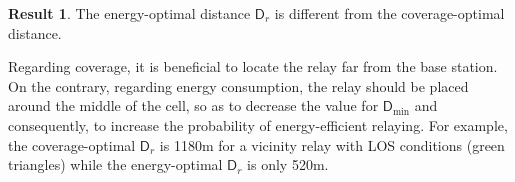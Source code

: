 \documentclass[journal]{IEEEtran}
\theoremstyle{definition}
\newtheorem{result}{Result}
\begin{document}
\vspace*{-5pt}\begin{result}
The energy-optimal distance $\mathsf{D}_r$ is different from the coverage-optimal distance.
\end{result} \vspace*{-5pt} \noindent
Regarding coverage, it is beneficial to locate the relay far from the base station. On the contrary, regarding energy consumption, the relay should be placed around the middle of the cell, so as to decrease the value for $\mathsf{D}_{\min}$ and consequently, to increase the probability of energy-efficient relaying. For example, the coverage-optimal $\mathsf{D}_r$ is 1180m for a vicinity relay with LOS conditions (green triangles) while the energy-optimal $\mathsf{D}_r$ is only 520m. 
\end{document}
